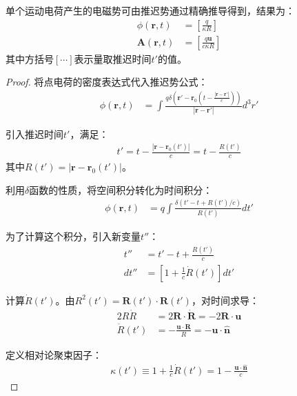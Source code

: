 \begin{theorem}[李纳-维谢尔势的推导]
单个运动电荷产生的电磁势可由推迟势通过精确推导得到，结果为：
\begin{align}
\phi(\mathbf{r},t) &= \left[\frac{q}{\kappa R}\right] \\
\mathbf{A}(\mathbf{r},t) &= \left[\frac{q\mathbf{u}}{c\kappa R}\right]
\end{align}
其中方括号$[\cdots]$表示量取推迟时间$t'$的值。
\end{theorem}

\begin{proof}
将点电荷的密度表达式代入推迟势公式：
\begin{align}
\phi(\mathbf{r},t) &= \int \frac{q\delta(\mathbf{r}'-\mathbf{r}_0(t-\frac{|\mathbf{r}-\mathbf{r}'|}{c}))}{|\mathbf{r}-\mathbf{r}'|}d^3r'
\end{align}

引入推迟时间$t'$，满足：
\begin{align}
t' = t - \frac{|\mathbf{r}-\mathbf{r}_0(t')|}{c} = t - \frac{R(t')}{c}
\end{align}
其中$R(t') = |\mathbf{r}-\mathbf{r}_0(t')|$。

利用$\delta$函数的性质，将空间积分转化为时间积分：
\begin{align}
\phi(\mathbf{r},t) &= q\int \frac{\delta(t'-t+R(t')/c)}{R(t')}dt'
\end{align}

为了计算这个积分，引入新变量$t''$：
\begin{align}
t'' &= t' - t + \frac{R(t')}{c} \\
dt'' &= \left[1 + \frac{1}{c}\dot{R}(t')\right]dt'
\end{align}

计算$\dot{R}(t')$。由$R^2(t') = \mathbf{R}(t')\cdot\mathbf{R}(t')$，对时间求导：
\begin{align}
2R\dot{R} &= 2\mathbf{R}\cdot\dot{\mathbf{R}} = -2\mathbf{R}\cdot\mathbf{u} \\
\dot{R}(t') &= -\frac{\mathbf{u}\cdot\mathbf{R}}{R} = -\mathbf{u}\cdot\hat{\mathbf{n}}
\end{align}

定义相对论聚束因子：
\begin{align}
\kappa(t') \equiv 1 + \frac{1}{c}\dot{R}(t') = 1 - \frac{\mathbf{u}\cdot\hat{\mathbf{n}}}{c}
\end{align}


\end{proof}
